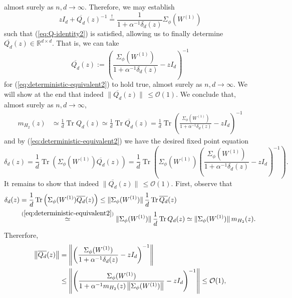 \documentclass{article}
\begin{document}
almost surely as $n,d\to\infty$. Therefore, we may establish
\begin{equation}
zI_{d}+\overline{Q_{d}}(z)^{-1}\stackrel{!}{=}\frac{1}{1+\alpha^{-1}\delta_d(z)}\Sigma_\phi(W^{(1)})
\end{equation}
such that (\ref{eq:Q-identity2}) is satisfied, allowing us to finally determine $\overline{Q_d}(z)\in\mathbb{R}^{d\times d}$. That is, we can take
\begin{equation}
\overline{Q_{d}}(z):=\left(\frac{\Sigma_\phi(W^{(1)})}{1+\alpha^{-1}\delta_d(z)}-zI_{d}\right)^{-1}
\end{equation}
for (\ref{eq:deterministic-equivalent2}) to hold true, almost surely as $n,d\to\infty$. We will show at the end that indeed $\|\overline{Q_d}(z)\|\,\leq\mathcal{O}(1)$. We conclude that, almost surely as $n,d\to\infty$,
\begin{align}
m_{H_2}(z) &\simeq\frac{1}{d}\operatorname{Tr}Q_{d}(z) \simeq\frac{1}{d}\operatorname{Tr}\overline{Q_{d}}(z) = \frac{1}{d}\operatorname{Tr}\left(\frac{\Sigma_\phi(W^{(1)})}{1+\alpha^{-1}\delta_d(z)}-zI_{d}\right)^{-1}
\end{align}
and by (\ref{eq:deterministic-equivalent2}) we have the desired fixed point equation
\begin{equation}
\delta_d(z)=\frac{1}{d}\operatorname{Tr}\left(\Sigma_\phi(W^{(1)})\overline{Q_d}(z)\right)=\frac{1}{d}\operatorname{Tr}\left(\Sigma_\phi(W^{(1)})\left(\frac{\Sigma_\phi(W^{(1)})}{1+\alpha^{-1}\delta_d(z)}-zI_{d}\right)^{-1}\right).
\end{equation}
It remains to show that indeed $\|\overline{Q_d}(z)\|\,\leq\mathcal{O}(1)$. First, observe that
\begin{align}
\delta_d(z) &= \frac{1}{d}\operatorname{Tr}\left(\Sigma_\phi(W^{(1)})\overline{Q_d}(z)\right)\leq\|\Sigma_\phi(W^{(1)})\|\,\frac{1}{d}\operatorname{Tr}\overline{Q_d}(z) \notag
\\ &\stackrel{(\ref{eq:deterministic-equivalent2})}{\simeq} \|\Sigma_\phi(W^{(1)})\|\,\frac{1}{d}\operatorname{Tr}Q_d(z)\simeq\|\Sigma_\phi(W^{(1)})\|\, m_{H_2}(z).
\end{align}
Thererfore,
\begin{align}
\left\|\overline{Q_d}(z)\right\| &= \left\|\left(\frac{\Sigma_\phi(W^{(1)})}{1+\alpha^{-1}\delta_d(z)}-zI_{d}\right)^{-1}\right\| \notag
\\ &\leq \left\|\left(\frac{\Sigma_\phi(W^{(1)})}{1+\alpha^{-1}m_{H_2}(z)\left\|\Sigma_\phi(W^{(1)})\right\|}-zI_{d}\right)^{-1}\right\|\leq\mathcal{O}(1),
\end{align}
\end{document}
